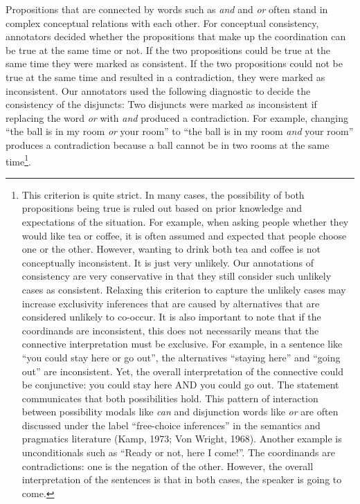 \documentclass[floatsintext,man]{apa6}
\theoremstyle{definition}
\theoremstyle{definition}
\theoremstyle{definition}
\theoremstyle{remark}
\begin{document}
Propositions that are connected by words such as \emph{and} and
\emph{or} often stand in complex conceptual relations with each other.
For conceptual consistency, annotators decided whether the propositions
that make up the coordination can be true at the same time or not. If
the two propositions could be true at the same time they were marked as
consistent. If the two propositions could not be true at the same time
and resulted in a contradiction, they were marked as inconsistent. Our
annotators used the following diagnostic to decide the consistency of
the disjuncts: Two disjuncts were marked as inconsistent if replacing
the word \emph{or} with \emph{and} produced a contradiction. For
example, changing \enquote{the ball is in my room \emph{or} your room}
to \enquote{the ball is in my room \emph{and} your room} produces a
contradiction because a ball cannot be in two rooms at the same
time\footnote{This criterion is quite strict. In many cases, the
  possibility of both propositions being true is ruled out based on
  prior knowledge and expectations of the situation. For example, when
  asking people whether they would like tea or coffee, it is often
  assumed and expected that people choose one or the other. However,
  wanting to drink both tea and coffee is not conceptually inconsistent.
  It is just very unlikely. Our annotations of consistency are very
  conservative in that they still consider such unlikely cases as
  consistent. Relaxing this criterion to capture the unlikely cases may
  increase exclusivity inferences that are caused by alternatives that
  are considered unlikely to co-occur. It is also important to note that
  if the coordinands are inconsistent, this does not necessarily means
  that the connective interpretation must be exclusive. For example, in
  a sentence like \enquote{you could stay here or go out}, the
  alternatives \enquote{staying here} and \enquote{going out} are
  inconsistent. Yet, the overall interpretation of the connective could
  be conjunctive: you could stay here AND you could go out. The
  statement communicates that both possibilities hold. This pattern of
  interaction between possibility modals like \emph{can} and disjunction
  words like \emph{or} are often discussed under the label
  \enquote{free-choice inferences} in the semantics and pragmatics
  literature (Kamp, 1973; Von Wright, 1968). Another example is
  unconditionals such as \enquote{Ready or not, here I come!}. The
  coordinands are contradictions: one is the negation of the other.
  However, the overall interpretation of the sentences is that in both
  cases, the speaker is going to come.}.
\end{document}
